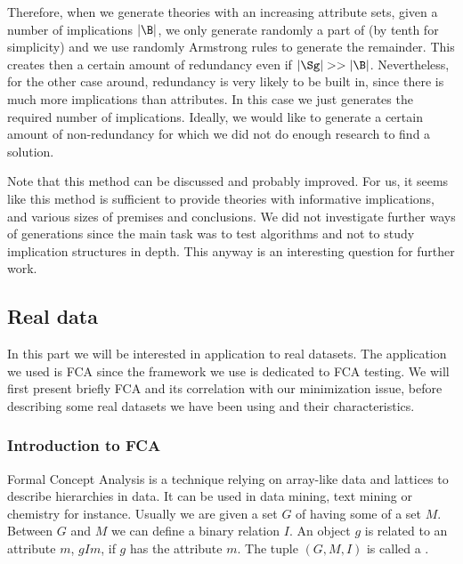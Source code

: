 \noindent Therefore, when we generate theories with an increasing attribute sets, given a number of implications $|\B|$, we only generate randomly a part of (by tenth for simplicity) and we use randomly Armstrong rules to generate
the remainder. This creates then a certain amount of redundancy even if $|\Sg| >> |\B|$. Nevertheless, for the other case around, redundancy is very likely to
be built in, since there is much more implications than attributes. In this case
we just generates the required number of implications. Ideally, we would like to
generate a certain amount of non-redundancy for which we did not do enough research to find a solution. 

\vspace{1.2em}

Note that this method can be discussed and probably improved. For us,
it seems like this method is sufficient to provide theories with informative
implications, and various sizes of premises and conclusions. We did not investigate further ways of generations since the main task was to test algorithms and not to study implication structures in depth. This anyway is an interesting question for further work.

\subsection{Real data}

In this part we will be interested in application to real datasets. The application we used is FCA since the framework we use is dedicated to FCA
testing. We will first present briefly FCA and its correlation with our
minimization issue, before describing some real datasets we have been using
and their characteristics.

\subsubsection{Introduction to FCA}

Formal Concept Analysis is a technique relying on array-like data and lattices
to describe hierarchies in data. It can be used in data mining, text mining or
chemistry for instance. Usually we are given a set $G$ of  having some  of a set $M$. Between $G$ and $M$ we can define
a binary relation $I$. An object $g$ is related to an attribute $m$, $gIm$, if
$g$ has the attribute $m$. The tuple $(G, M, I)$ is called a .

\vspace{1.2em}

